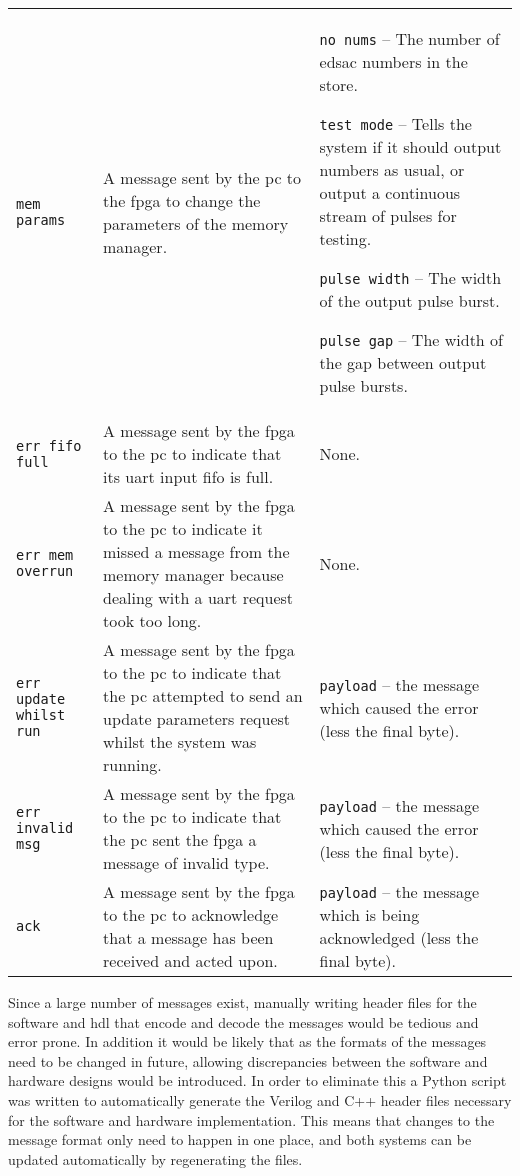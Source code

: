 \begin{longtable}{>{\raggedright}p{}  >{\raggedright}p{} >{\raggedright}p{} }
\texttt{mem params} & A message sent by the \gls{pc} to the \gls{fpga} to change the parameters of the memory manager. & \texttt{no nums} -- The number of \gls{edsac} numbers in the store.

\texttt{test mode} -- Tells the system if it should output numbers as usual, or output a continuous stream of pulses for testing.

\texttt{pulse width} -- The width of the output pulse burst.

\texttt{pulse gap} -- The width of the gap between output pulse bursts. \tabularnewline


\texttt{err fifo full} & A message sent by the \gls{fpga} to the \gls{pc} to indicate that its \gls{uart} input \gls{fifo} is full. & None. \tabularnewline

		
		\texttt{err mem overrun} & A message sent by the \gls{fpga} to the \gls{pc} to indicate it missed a message from the memory manager because dealing with a \gls{uart} request took too long. & None. \tabularnewline


\texttt{err update whilst run} & A message sent by the \gls{fpga} to the \gls{pc} to indicate that the \gls{pc} attempted to send an update parameters request whilst the system was running. & \texttt{payload} -- the message which caused the error (less the final byte). \tabularnewline


\texttt{err invalid msg} & A message sent by the \gls{fpga} to the \gls{pc} to indicate that the \gls{pc} sent the \gls{fpga} a message of invalid type.& \texttt{payload} -- the message which caused the error (less the final byte). \tabularnewline


\texttt{ack} & A message sent by the \gls{fpga} to the \gls{pc} to acknowledge that a message has been received and acted upon. & \texttt{payload} -- the message which is being acknowledged (less the final byte). \tabularnewline
	
\end{longtable}

Since a large number of messages exist, manually writing header files for the software and \gls{hdl} that encode and decode the messages would be tedious and error prone. In addition it would be likely that as the formats of the messages need to be changed in future, allowing discrepancies between the software and hardware designs would be introduced. In order to eliminate this a Python script was written to automatically generate the Verilog and C++ header files necessary for the software and hardware implementation. This means that changes to the message format only need to happen in one place, and both systems can be updated automatically by regenerating the files.



